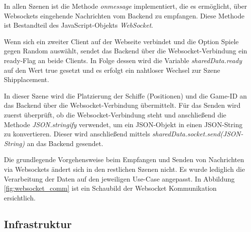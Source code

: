 \documentclass[a4paper, 10pt, conference]{IEEEtran}
\begin{document}
In allen Szenen ist die Methode \textit{onmessage} implementiert, die es ermöglicht, über Websockets eingehende Nachrichten vom Backend zu empfangen. Diese Methode ist Bestandteil des JavaScript-Objekts \textit{WebSocket}.

Wenn sich ein zweiter Client auf der Webseite verbindet und die Option \glqq Spiele gegen Random\grqq{} auswählt, sendet das Backend über die Websocket-Verbindung ein \glqq ready\grqq{}-Flag an beide Clients. In Folge dessen wird die Variable \textit{sharedData.ready} auf den Wert \glqq true\grqq{} gesetzt und es erfolgt ein nahtloser Wechsel zur Szene \glqq Shipplacement\grqq{}.

In dieser Szene wird die Platzierung der Schiffe (Positionen) und die Game-ID an das Backend über die Websocket-Verbindung übermittelt. Für das Senden wird zuerst überprüft, ob die Websocket-Verbindung steht und anschließend die Methode \textit{JSON.stringify} verwendet, um ein JSON-Objekt in einen JSON-String zu konvertieren. Dieser wird anschließend mittels \textit{sharedData.socket.send(JSON-String)} an das Backend gesendet.

 Die grundlegende Vorgehensweise beim Empfangen und Senden von Nachrichten via Websockets ändert sich in den restlichen Szenen nicht. Es wurde lediglich die Verarbeitung der Daten auf den jeweiligen Use-Case angepasst. In Abbildung \ref{fig:websocket_comm} ist ein Schaubild der Websocket Kommunikation ersichtlich.





\subsection{Infrastruktur}\label{subsec:infrastruktur}
\end{document}
